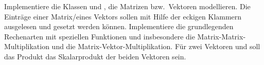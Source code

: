 \begin{aufg}
  Implementiere die Klassen  und , die Matrizen bzw.\
  Vektoren modellieren.
  Die Einträge einer Matrix/eines Vektors sollen mit Hilfe der eckigen Klammern
  \lpy{[]} ausgelesen und gesetzt werden können.
  Implementiere die grundlegenden Rechenarten mit speziellen Funktionen und
  insbesondere die Matrix-Matrix-Multiplikation und die Matrix-Vektor-Multiplikation.
  Für zwei Vektoren \lpy{A} und \lpy{B} soll das Produkt \lpy{A*B} das 
  Skalarprodukt der beiden Vektoren sein.
\end{aufg}
